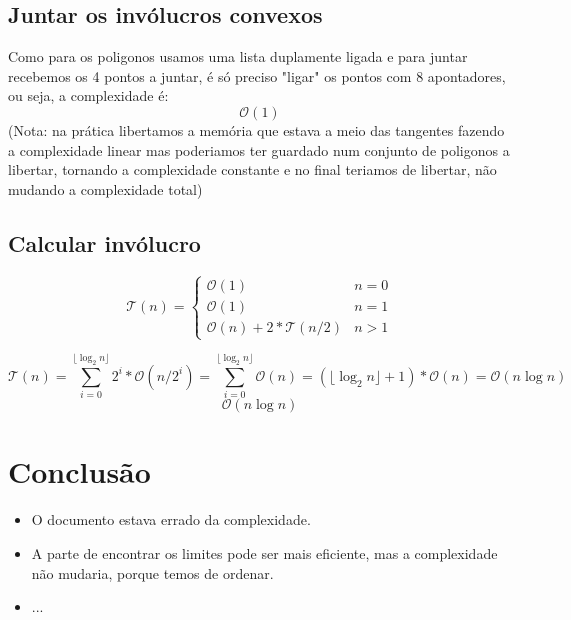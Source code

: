 \documentclass[11pt]{article}
\begin{document}
\subsection{Juntar os invólucros convexos}
Como para os poligonos usamos uma lista duplamente ligada e
para juntar recebemos os 4 pontos a juntar, é só preciso 
"ligar" os pontos com 8 apontadores, ou seja, a complexidade é: 
$$\mathcal{O}(1)$$
(Nota: na prática libertamos a memória que estava 
a meio das tangentes fazendo a complexidade linear
mas poderiamos ter guardado num conjunto de poligonos 
a libertar, tornando a complexidade constante e no final 
teriamos de libertar, não mudando a complexidade total)

\subsection{Calcular invólucro}
$$
    \mathcal{T}(n) = 
        \begin{cases}
            \mathcal{O}(1)                      & n = 0\\
            \mathcal{O}(1)                      & n = 1\\
            \mathcal{O}(n) + 2*\mathcal{T}(n/2) & n > 1
        \end{cases}
$$

$$
    \mathcal{T}(n) = \sum_{i=0}^{\lfloor\log_{2}n\rfloor} 2^i*\mathcal{O}(n/2^i)
    = \sum_{i=0}^{\lfloor\log_{2}n\rfloor} \mathcal{O}(n)
    = (\lfloor\log_{2}n\rfloor + 1)*\mathcal{O}(n)
    = \mathcal{O}(n\log{n})
$$
$$
    \mathcal{O}(n\log{n})
$$


\section{Conclusão}
\begin{itemize}
    \item O documento estava errado da complexidade.
    \item A parte de encontrar os limites pode ser mais eficiente, 
        mas a complexidade não mudaria, porque temos de ordenar.
    \item ...
\end{itemize}
\end{document}
